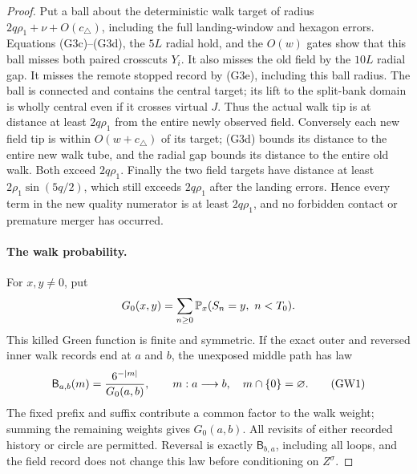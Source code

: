 \begin{proof}
Put a ball about the deterministic walk target of radius
\(2q\rho_1+\nu+O(c_\triangle)\), including the full landing-window
and hexagon errors.  Equations (G3c)--(G3d), the \(5L\) radial hold,
and the \(O(w)\) gates show that this ball misses both paired crosscuts
\(Y_i\).  It also misses the old field by the \(10L\) radial gap.
It misses the remote stopped record by (G3e), including this ball radius.
The ball is connected and contains the central target; its lift to the
split-bank domain is wholly central even if it crosses virtual \(J\).
Thus the actual walk tip is at distance at least \(2q\rho_1\) from the
entire newly observed field.  Conversely each new field tip is within
\(O(w+c_\triangle)\) of its target; (G3d) bounds its distance to the
entire new walk tube, and the radial gap bounds its distance to the entire
old walk.  Both exceed \(2q\rho_1\).  Finally the two field targets have
distance at least \(2\rho_1\sin(5q/2)\), which still exceeds
\(2q\rho_1\) after the landing errors.  Hence every term in the new
quality numerator is at least \(2q\rho_1\), and no forbidden contact
or premature merger has occurred.

\paragraph{The walk probability.}
For \(x,y\ne0\), put
\[
 G_0(x,y)=\sum_{n\ge0}\Prob_x(S_n=y,\ n<T_0).
\]
This killed Green function is finite and symmetric.  If the exact outer
and reversed inner walk records end at \(a\) and \(b\), the unexposed
middle path has law
\[
 \mathsf B_{a,b}(m)={6^{-|m|}\over G_0(a,b)},\qquad
 m:a\longrightarrow b,\quad m\cap\{0\}=\varnothing.          \tag{GW1}
\]
The fixed prefix and suffix contribute a common factor to the walk weight;
summing the remaining weights gives \(G_0(a,b)\).  All revisits of either
recorded history or circle are permitted.  Reversal is exactly
\(\mathsf B_{b,a}\), including all loops, and the field record does not
change this law before conditioning on \(Z^\sigma\).


\end{proof}
